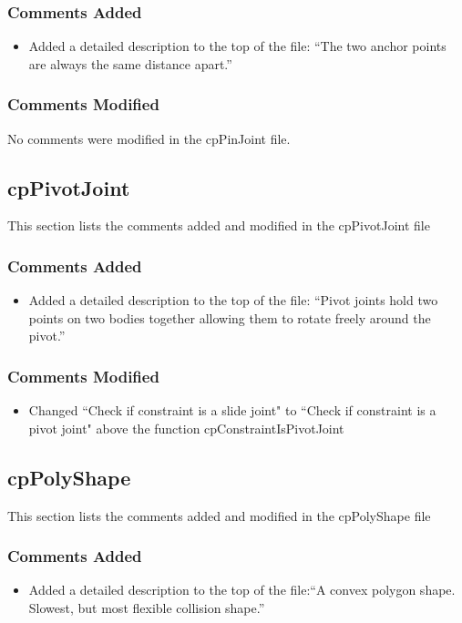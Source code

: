 \documentclass[12pt]{article}
\begin{document}
\subsubsection{Comments Added}
\begin{itemize}
\item Added a detailed description to the top of the file: ``The two anchor points are always the same distance apart.''
\end{itemize}

\subsubsection{Comments Modified}
No comments were modified in the cpPinJoint file.


\subsection{cpPivotJoint} 
This section lists the comments added and modified  in the cpPivotJoint file

\subsubsection{Comments Added}
\begin{itemize}
\item Added a detailed description to the top of the file: ``Pivot joints hold two points on two bodies together allowing them to rotate freely around the pivot.''
\end{itemize}

\subsubsection{Comments Modified}
\begin{itemize}
\item Changed ``Check if constraint is a slide joint" to ``Check if constraint is a pivot joint" above the function cpConstraintIsPivotJoint
\end{itemize}

\subsection{cpPolyShape} 
This section lists the comments added and modified  in the cpPolyShape file

\subsubsection{Comments Added}
\begin{itemize}
\item Added a detailed description to the top of the file:``A convex polygon shape. Slowest, but most flexible collision shape.''
\end{itemize}
\end{document}
